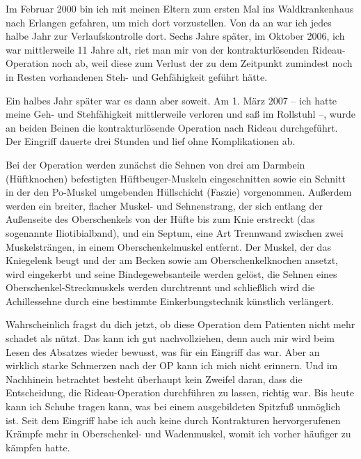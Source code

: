 \documentclass[fontsize=14pt,a4paper,headinclude,DIV=calc,automark]{scrbook}
\begin{document}
Im Februar 2000 bin ich mit meinen Eltern zum ersten Mal ins Waldkrankenhaus nach Erlangen gefahren, um mich dort vorzustellen. Von da an war ich jedes halbe Jahr zur Verlaufskontrolle dort. Sechs Jahre später, im Oktober 2006, ich war mittlerweile 11 Jahre alt, riet man mir von der kontrakturlösenden Rideau-Operation noch ab, weil diese zum Verlust der zu dem Zeitpunkt zumindest noch in Resten vorhandenen Steh- und Gehfähigkeit geführt hätte.

Ein halbes Jahr später war es dann aber soweit. Am 1. März 2007 – ich hatte meine Geh- und Stehfähigkeit mittlerweile verloren und saß im Rollstuhl –, wurde an beiden Beinen die kontrakturlösende Operation nach Rideau durchgeführt. Der Eingriff dauerte drei Stunden und lief ohne Komplikationen ab.

Bei der Operation werden zunächst die Sehnen von drei am Darmbein (Hüftknochen) befestigten Hüftbeuger-Muskeln eingeschnitten sowie ein Schnitt in der den Po-Muskel umgebenden Hüllschicht (Faszie) vorgenommen. Außerdem werden ein breiter, flacher Muskel- und Sehnenstrang, der sich entlang der Außenseite des Oberschenkels von der Hüfte bis zum Knie erstreckt (das sogenannte Iliotibialband), und ein Septum, eine Art Trennwand zwischen zwei Muskelsträngen, in einem Oberschenkelmuskel entfernt. Der Muskel, der das Kniegelenk beugt und der am Becken sowie am Oberschenkelknochen ansetzt, wird eingekerbt und seine Bindegewebsanteile werden gelöst, die Sehnen eines Oberschenkel-Streckmuskels werden durchtrennt und schließlich wird die Achillessehne durch eine bestimmte Einkerbungstechnik künstlich verlängert.

Wahrscheinlich fragst du dich jetzt, ob diese Operation dem Patienten nicht mehr schadet als nützt. Das kann ich gut nachvollziehen, denn auch mir wird beim Lesen des Absatzes wieder bewusst, was für ein Eingriff das war. Aber an wirklich starke Schmerzen nach der OP kann ich mich nicht erinnern. Und im Nachhinein betrachtet besteht überhaupt kein Zweifel daran, dass die Entscheidung, die Rideau-Operation durchführen zu lassen, richtig war. Bis heute kann ich Schuhe tragen kann, was bei einem ausgebildeten Spitzfuß unmöglich ist. Seit dem Eingriff habe ich auch keine durch Kontrakturen hervorgerufenen Krämpfe mehr in Oberschenkel- und Wadenmuskel, womit ich vorher häufiger zu kämpfen hatte.
\end{document}
